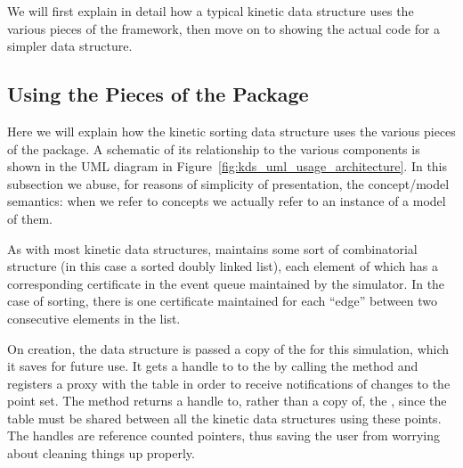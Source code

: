 



We will first explain in detail how a typical kinetic data structure
uses the various pieces of the framework, then move on to showing the
actual code for a simpler data structure.

\subsection{Using the Pieces of the Package}

Here we will explain how the kinetic sorting data structure uses the
various pieces of the package. A schematic of its relationship to the
various components is shown in the UML diagram in
Figure~\ref{fig:kds_uml_usage_architecture}. In this subsection we
abuse, for reasons of simplicity of presentation, the concept/model
semantics: when we refer to concepts we actually refer to an instance
of a model of them.

As with most kinetic data structures,  maintains some sort of combinatorial structure (in this
case a sorted doubly linked list), each element of which has a
corresponding certificate in the event queue maintained by the
simulator. In the case of sorting, there is one certificate maintained
for each ``edge'' between two consecutive elements in the list.

On creation, the data structure is passed a copy of the
 for this simulation, which it saves for
future use. It gets a handle to to the
 by calling the
method and registers a proxy with the table in order to receive
notifications of changes to the point set.  The
 method returns a handle to, rather
than a copy of, the , since the table must
be shared between all the kinetic data structures using these points.
The handles are reference counted pointers, thus saving the user from
worrying about cleaning things up properly.

